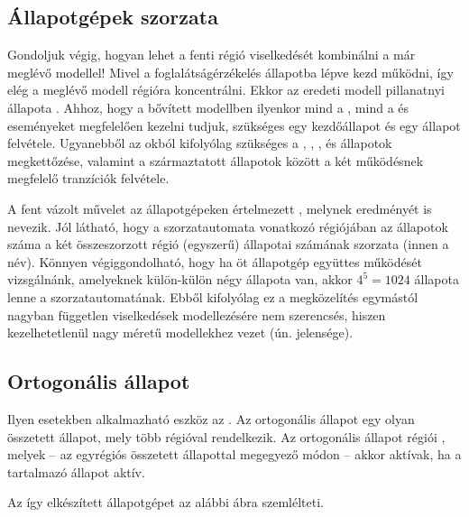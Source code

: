 \subsection{Állapotgépek szorzata}

Gondoljuk végig, hogyan lehet a fenti  régió viselkedését kombinálni a már meglévő modellel! Mivel a foglalátságérzékelés  állapotba lépve kezd működni, így elég a meglévő modell  régióra koncentrálni. Ekkor az eredeti modell pillanatnyi állapota . Ahhoz, hogy a bővített modellben ilyenkor mind a , mind a  és  eseményeket megfelelően kezelni tudjuk, szükséges egy  kezdőállapot és egy  állapot felvétele. Ugyanebből az okból kifolyólag szükséges a , , ,  és  állapotok megkettőzése, valamint a származtatott állapotok között a két működésnek megfelelő tranzíciók felvétele.

A fent vázolt művelet az állapotgépeken értelmezett , melynek eredményét  is nevezik. Jól látható, hogy a szorzatautomata vonatkozó régiójában az állapotok száma a két összeszorzott régió (egyszerű) állapotai számának szorzata (innen a név). Könnyen végiggondolható, hogy ha öt állapotgép együttes működését vizsgálnánk, amelyeknek külön-külön négy állapota van, akkor $4^5=1024$ állapota lenne a szorzatautomatának. Ebből kifolyólag ez a megközelítés egymástól nagyban független viselkedések modellezésére nem szerencsés, hiszen kezelhetetlenül nagy méretű modellekhez vezet (ún.  jelensége).

\subsection{Ortogonális állapot}

Ilyen esetekben alkalmazható eszköz az . Az ortogonális állapot egy olyan összetett állapot, mely több régióval rendelkezik. Az ortogonális állapot régiói , melyek -- az egyrégiós összetett állapottal megegyező módon -- akkor aktívak, ha a tartalmazó állapot aktív.

Az így elkészített állapotgépet az alábbi ábra szemlélteti.


